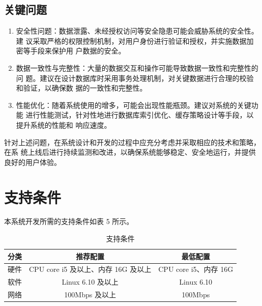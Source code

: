 \documentclass[
    report,     %
    oneside,    %
    UTF8,       %
    zihao=-4    %
]{config} %
\begin{document}
\subsection{关键问题}
\begin{enumerate}[label=(\arabic*)]
\item 安全性问题：数据泄露、未经授权访问等安全隐患可能会威胁系统的安全性。建
议采取严格的权限控制机制，对用户身份进行验证和授权，并实施数据加密等手段来保护用
户数据的安全。
\item 数据一致性与完整性：大量的数据交互和操作可能导致数据一致性和完整性的问
题。建议在设计数据库时采用事务处理机制，对关键数据进行合理的校验和验证，以确保数
据的一致性和完整性。
\item 性能优化：随着系统使用的增多，可能会出现性能瓶颈。建议对系统的关键功能
进行性能测试，针对性地进行数据库索引优化、缓存策略设计等手段，以提升系统的性能和
响应速度。
\end{enumerate}
针对上述问题，在系统设计和开发的过程中应充分考虑并采取相应的技术和策略，在系
统上线后进行持续监测和改进，以确保系统能够稳定、安全地运行，并提供良好的用户体验。
\section{支持条件}
本系统开发所需的支持条件如表 5 所示。
\begin{table}[H] %
    \centering %
    \caption{支持条件} %
    \label{tab:conditions} %
    \renewcommand\arraystretch{0.85} %
    \setlength{\tabcolsep}{12pt} %
    \begin{tabular}{ccc} %
        \toprule[1.5pt] %
        \textbf{分类} & \textbf{推荐配置} & \textbf{最低配置} \\ %
        \midrule[0.8pt] %
        硬件 & CPU core i5 及以上、内存 16G 及以上 & CPU core i5、内存 16G \\ %
        软件 & Linux 6.10 及以上 & Linux 6.10 \\ %
        网络 & 100Mbps 及以上 & 100Mbps \\ %
        \hline\hline %
    \end{tabular}
\end{table}
\end{document}
